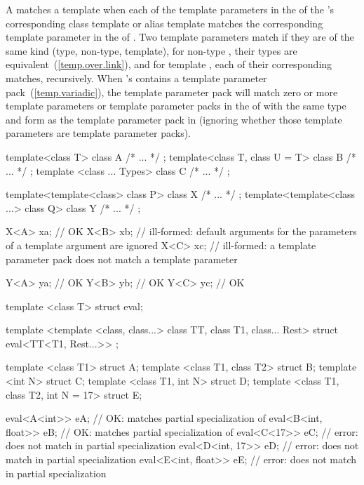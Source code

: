 \pnum A  matches a template
  when each of the template
parameters in the  of the
's corresponding class template or alias template
 matches the corresponding template parameter in the
 of . 
Two template parameters match if they are of the same kind (type, non-type, template),
for non-type , their types are
equivalent~(\ref{temp.over.link}), and for template ,
each of their corresponding  matches, recursively.
When 's  contains a template parameter
pack~(\ref{temp.variadic}), the template parameter pack will match zero or more template
parameters or template parameter packs in the  of
 with the same type and form as the template parameter pack in 
(ignoring whether those template parameters are template parameter packs).

\enterexample
\begin{codeblock}
template<class T> class A { /* ... */ };
template<class T, class U = T> class B { /* ... */ };
template <class ... Types> class C { /* ... */ };

template<template<class> class P> class X { /* ... */ };
template<template<class ...> class Q> class Y { /* ... */ };

X<A> xa;            // OK
X<B> xb;            // ill-formed: default arguments for the parameters of a template argument are ignored
X<C> xc;            // ill-formed: a template parameter pack does not match a template parameter

Y<A> ya;            // OK
Y<B> yb;            // OK
Y<C> yc;            // OK
\end{codeblock}
\exitexample

\enterexample
\begin{codeblock}
template <class T> struct eval;

template <template <class, class...> class TT, class T1, class... Rest>
struct eval<TT<T1, Rest...>> { };

template <class T1> struct A;
template <class T1, class T2> struct B;
template <int N> struct C;
template <class T1, int N> struct D;
template <class T1, class T2, int N = 17> struct E;

eval<A<int>> eA;                // OK: matches partial specialization of 
eval<B<int, float>> eB;         // OK: matches partial specialization of 
eval<C<17>> eC;                 // error:  does not match  in partial specialization
eval<D<int, 17>> eD;            // error:  does not match  in partial specialization
eval<E<int, float>> eE;         // error:  does not match  in partial specialization
\end{codeblock}
\exitexample

